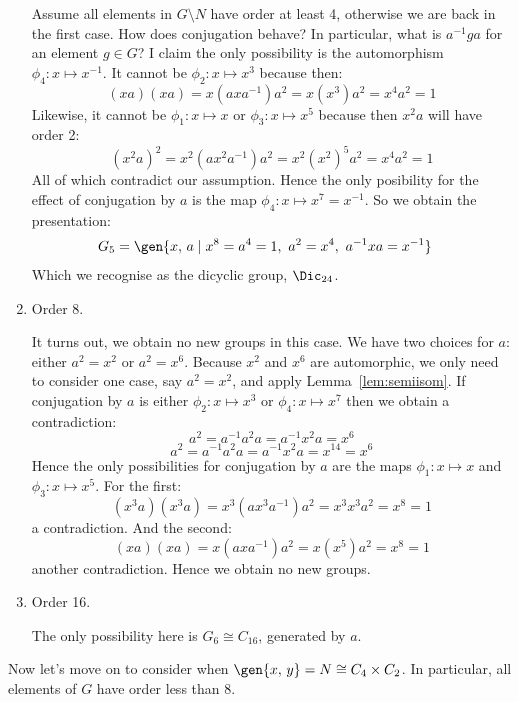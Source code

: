 \begin{enumerate}
        Assume all elements in \(G\setminus N\) have order at least 4, otherwise we are back in the first case.
        How does conjugation behave?
        In particular, what is \(a^{-1}ga\) for an element \(g \in G\)?
        I claim the only possibility is the automorphism \(\phi_4:x\mapsto x^{-1}\).
        It cannot be \(\phi_2:x\mapsto x^3\) because then:
        \[(xa)(xa) = x(axa^{-1})a^2 = x(x^3) a^2 = x^4 a^2 = 1\]
        Likewise, it cannot be \(\phi_1:x\mapsto x\) or \(\phi_3:x\mapsto x^5\) because then \(x^2 a\) will have order 2:
        \[{(x^2 a)}^2 = x^2 (ax^2 a^{-1})a^2 = x^2 {(x^2)}^5 a^2 = x^4 a^2 = 1\]
        All of which contradict our assumption.
        Hence the only posibility for the effect of conjugation by \(a\) is the map \(\phi_4:x\mapsto x^7 = x^{-1}\).
        So we obtain the presentation:
        \begin{align*}
            G_5 &= \gen{x,\,a \mid x^8 = a^4 = 1,\ a^2 = x^4,\ a^{-1}xa = x^{-1}}
        \end{align*}
        Which we recognise as the dicyclic group, \(\Dic_{24}\).

    \item Order 8.

        It turns out, we obtain no new groups in this case.
        We have two choices for \(a\): either \(a^2 = x^2\) or \(a^2 = x^6\).
        Because \(x^2\) and \(x^6\) are automorphic, we only need to consider one case, say \(a^2 = x^2\), and apply
        Lemma~\ref{lem:semiisom}.
        If conjugation by \(a\) is either \(\phi_2:x\mapsto x^3\) or \(\phi_4:x\mapsto x^7\) then we obtain a
        contradiction:
        \[a^2 = a^{-1}a^2 a = a^{-1}x^2 a = x^6\]
        \[a^2 = a^{-1}a^2 a = a^{-1}x^2 a = x^{14} = x^6\]
        Hence the only possibilities for conjugation by \(a\) are the maps \(\phi_1:x\mapsto x\) and \(\phi_3:x \mapsto
        x^5\).
        For the first:
        \[(x^3 a)(x^3 a) = x^3(ax^3 a^{-1})a^2 = x^3 x^3 a^2 = x^8 = 1\]
        a contradiction.
        And the second:
        \[(xa)(xa) = x(axa^{-1})a^2 = x(x^5)a^2 = x^8 = 1\]
        another contradiction.
        Hence we obtain no new groups.

    \item Order 16.

        The only possibility here is \(G_6 \cong C_{16}\), generated by \(a\).
\end{enumerate}

Now let's move on to consider when \(\gen{x,\,y} = N \cong C_4 \times C_2\).
In particular, all elements of \(G\) have order less than 8.

